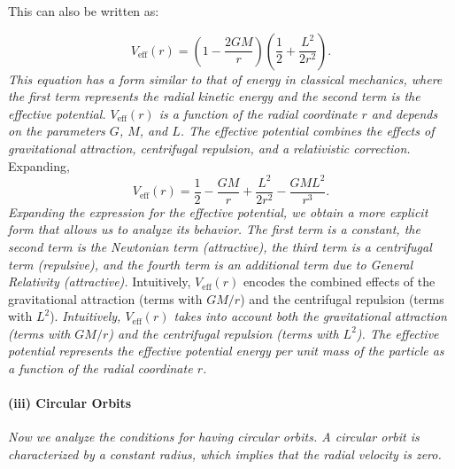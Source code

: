 This can also be written as:

\begin{equation}
V_{\mathrm{eff}}(r) = \left(1 - \frac{2GM}{r}\right)\left(\frac{1}{2} + \frac{L^2}{2r^2}\right).
\end{equation}
\textit{This equation has a form similar to that of energy in classical mechanics, where the first term represents the radial kinetic energy and the second term is the effective potential. $V_{\mathrm{eff}}(r)$ is a function of the radial coordinate $r$ and depends on the parameters $G$, $M$, and $L$. The effective potential combines the effects of gravitational attraction, centrifugal repulsion, and a relativistic correction.}
Expanding,
\begin{equation}
V_{\mathrm{eff}}(r) = \frac{1}{2} - \frac{GM}{r} + \frac{L^2}{2r^2} - \frac{GM L^2}{r^3}.
\end{equation}
\textit{Expanding the expression for the effective potential, we obtain a more explicit form that allows us to analyze its behavior. The first term is a constant, the second term is the Newtonian term (attractive), the third term is a centrifugal term (repulsive), and the fourth term is an additional term due to General Relativity (attractive).}
Intuitively, $V_{\mathrm{eff}}(r)$ encodes the combined effects of the gravitational attraction (terms with $GM/r$) and the centrifugal repulsion (terms with $L^2$).
\textit{Intuitively, $V_{\mathrm{eff}}(r)$ takes into account both the gravitational attraction (terms with $GM/r$) and the centrifugal repulsion (terms with $L^2$). The effective potential represents the effective potential energy per unit mass of the particle as a function of the radial coordinate $r$.}

\paragraph{(iii) Circular Orbits}
\textit{Now we analyze the conditions for having circular orbits. A circular orbit is characterized by a constant radius, which implies that the radial velocity is zero.}

